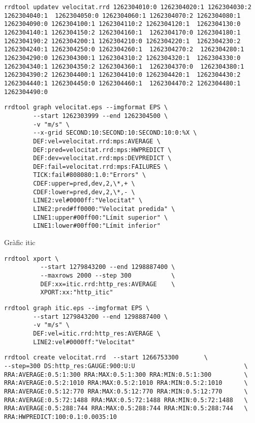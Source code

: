 \begin{lstlisting}
rrdtool updatev velocitat.rrd 1262304010:0 1262304020:1 1262304030:2 1262304040:1  1262304050:0 1262304060:1 1262304070:2 1262304080:1  1262304090:0 1262304100:1 1262304110:2 1262304120:1  1262304130:0 1262304140:1 1262304150:2 1262304160:1  1262304170:0 1262304180:1  1262304190:2 1262304200:1 1262304210:0 1262304220:1  1262304230:2 1262304240:1 1262304250:0 1262304260:1  1262304270:2  1262304280:1  1262304290:0 1262304300:1 1262304310:2 1262304320:1  1262304330:0 1262304340:1 1262304350:2 1262304360:1  1262304370:0  1262304380:1  1262304390:2 1262304400:1 1262304410:0 1262304420:1  1262304430:2 1262304440:1 1262304450:0 1262304460:1  1262304470:2 1262304480:1  1262304490:0
\end{lstlisting}

\begin{lstlisting}
rrdtool graph velocitat.eps --imgformat EPS \
        --start 1262303999 --end 1262304500 \
        -v "m/s" \
        --x-grid SECOND:10:SECOND:10:SECOND:10:0:%X \
        DEF:vel=velocitat.rrd:mps:AVERAGE \
        DEF:pred=velocitat.rrd:mps:HWPREDICT \
        DEF:dev=velocitat.rrd:mps:DEVPREDICT \
        DEF:fail=velocitat.rrd:mps:FAILURES \
        TICK:fail#808080:1.0:"Errors" \
        CDEF:upper=pred,dev,2,\*,+ \
        CDEF:lower=pred,dev,2,\*,- \
        LINE2:vel#0000ff:"Velocitat" \
        LINE2:pred#ff0000:"Velocitat predida" \
        LINE1:upper#00ff00:"Límit superior" \
        LINE1:lower#00ff00:"Límit inferior" 
\end{lstlisting}



Gràfic itic
\begin{lstlisting}
rrdtool xport \
          --start 1279843200 --end 1298887400 \
          --maxrows 2000 --step 300           \
          DEF:xx=itic.rrd:http_res:AVERAGE    \
          XPORT:xx:"http_itic" 
\end{lstlisting}

\begin{lstlisting}
rrdtool graph itic.eps --imgformat EPS \
        --start 1279843200 --end 1298887400 \
        -v "m/s" \
        DEF:vel=itic.rrd:http_res:AVERAGE \
        LINE2:vel#0000ff:"Velocitat" 
\end{lstlisting}

\begin{lstlisting}
rrdtool create velocitat.rrd  --start 1266753300       \
--step=300 DS:http_res:GAUGE:900:U:U                              \
RRA:AVERAGE:0.5:1:300 RRA:MAX:0.5:1:300 RRA:MIN:0.5:1:300         \
RRA:AVERAGE:0.5:2:1010 RRA:MAX:0.5:2:1010 RRA:MIN:0.5:2:1010      \
RRA:AVERAGE:0.5:12:770 RRA:MAX:0.5:12:770 RRA:MIN:0.5:12:770      \
RRA:AVERAGE:0.5:72:1488 RRA:MAX:0.5:72:1488 RRA:MIN:0.5:72:1488   \
RRA:AVERAGE:0.5:288:744 RRA:MAX:0.5:288:744 RRA:MIN:0.5:288:744   \
RRA:HWPREDICT:100:0.1:0.0035:10
\end{lstlisting}

